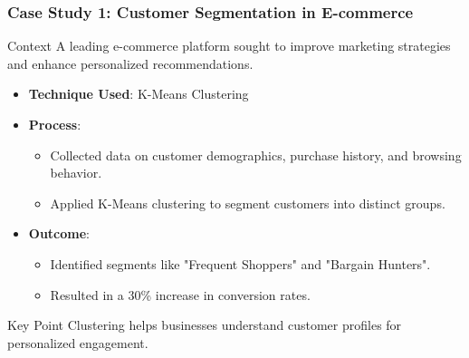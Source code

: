 \documentclass[aspectratio=169]{beamer}
\begin{document}
\begin{frame}[fragile]
    \frametitle{Case Study 1: Customer Segmentation in E-commerce}
    
    \begin{block}{Context}
        A leading e-commerce platform sought to improve marketing strategies and enhance personalized recommendations.
    \end{block}

    \begin{itemize}
        \item \textbf{Technique Used}: K-Means Clustering
        \item \textbf{Process}:
        \begin{itemize}
            \item Collected data on customer demographics, purchase history, and browsing behavior.
            \item Applied K-Means clustering to segment customers into distinct groups.
        \end{itemize}
        \item \textbf{Outcome}:
        \begin{itemize}
            \item Identified segments like "Frequent Shoppers" and "Bargain Hunters".
            \item Resulted in a 30\% increase in conversion rates.
        \end{itemize}
    \end{itemize}

    \begin{block}{Key Point}
        Clustering helps businesses understand customer profiles for personalized engagement.
    \end{block}
\end{frame}
\end{document}
